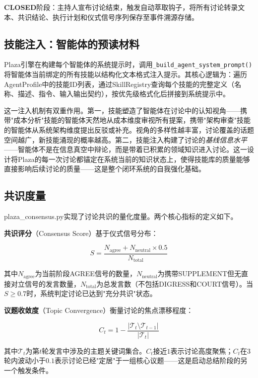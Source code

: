 \documentclass[conference]{IEEEtran}
\begin{document}
\textbf{CLOSED}阶段：主持人宣布讨论结束，触发自动萃取钩子，将所有讨论转录文本、共识结论、执行计划和仪式信号序列保存至事件溯源存储。

\subsection{技能注入：智能体的预读材料}

Plaza引擎在构建每个智能体的系统提示时，调用\texttt{\_build\_agent\_system\_prompt()}将智能体当前绑定的所有技能以结构化文本格式注入提示。其核心逻辑为：遍历AgentProfile中的技能ID列表，通过SkillRegistry查询每个技能的完整定义（名称、描述、指令、输入输出契约），按优先级格式化后拼接到系统提示中。

这一注入机制有双重作用。第一，技能塑造了智能体在讨论中的认知视角——携带"成本分析"技能的智能体天然地从成本维度审视所有提案，携带"架构审查"技能的智能体从系统架构维度提出反驳或补充。视角的多样性越丰富，讨论覆盖的话题空间越广，新技能涌现的概率越高。第二，技能注入构建了讨论的\emph{基线信息水平}——智能体不是在信息真空中辩论，而是带着已积累的领域知识进入讨论。这一设计将Plaza的每一次讨论都锚定在系统当前的知识状态上，使得技能库的质量能够直接影响后续讨论的质量——这是整个闭环系统的自我强化基础。

\subsection{共识度量}

plaza\_consensus.py实现了讨论共识的量化度量。两个核心指标的定义如下。

\textbf{共识评分}（Consensus Score）基于仪式信号分布：

\begin{equation}
S = \frac{N_{\mathrm{agree}} + N_{\mathrm{neutral}} \times 0.5}{N_{\mathrm{total}}}
\label{eq:consensus}
\end{equation}

其中$N_{\mathrm{agree}}$为当前阶段AGREE信号的数量，$N_{\mathrm{neutral}}$为携带SUPPLEMENT但无直接对立信号的发言数量，$N_{\mathrm{total}}$为总发言数（不包括DIGRESS和COURT信号）。当$S \geq 0.7$时，系统判定讨论已达到"充分共识"状态。

\textbf{议题收敛度}（Topic Convergence）衡量讨论的焦点漂移程度：

\begin{equation}
C_t = 1 - \frac{|\mathcal{T}_t \setminus \mathcal{T}_{t-1}|}{|\mathcal{T}_t|}
\label{eq:convergence}
\end{equation}

其中$\mathcal{T}_t$为第$t$轮发言中涉及的主题关键词集合。$C_t$接近$1$表示讨论高度聚焦；$C_t$在$3$轮内波动小于$0.1$表示讨论已经"定居"于一组核心议题——这是启动总结阶段的另一个触发条件。
\end{document}
